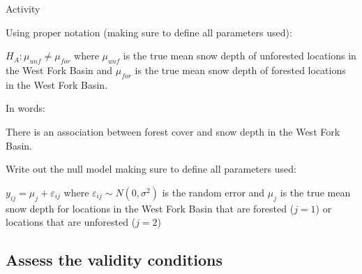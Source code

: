 \documentclass[12pt]{article}\usepackage[]{graphicx}\usepackage[]{color}
\begin{document}
\begin{exam}{Activity}
\begin{problem*}
\begin{parts}
\item Using proper notation (making sure to define all parameters used):
\begin{solution}[2cm]
$H_A: \mu_{unf} \neq \mu_{for}$ where $\mu_{unf}$ is the true mean snow depth of unforested locations in the West Fork Basin and $\mu_{for}$ is the true mean snow depth of forested locations in the West Fork Basin.
\end{solution}
  \item In words:
  \begin{solution}[2cm]
There is an association between forest cover and snow depth in the West Fork Basin.
\end{solution}
  \item Write out the null model making sure to define all parameters used:
  \begin{solution}[2cm]
$y_{ij} = \mu_j + \varepsilon_{ij}$ where $\varepsilon_{ij} \sim{} N(0,\sigma^2)$ is the random error and $\mu_j$ is the true mean snow depth for locations in the West Fork Basin that are forested ($j=1$) or locations that are unforested ($j=2$)
\end{solution}
\end{parts}
\end{problem*}

\subsection*{Assess the validity conditions}


\end{exam}
\end{document}
